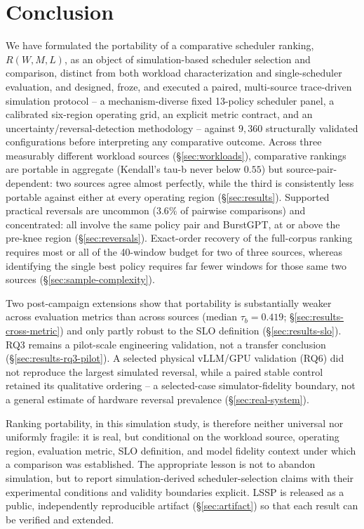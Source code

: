 \section{Conclusion}
\label{sec:conclusion}

We have formulated the portability of a comparative scheduler ranking,
$R(W, M, L)$, as an object of simulation-based scheduler selection and
comparison, distinct from both workload characterization and
single-scheduler evaluation, and designed, froze, and executed a paired,
multi-source trace-driven simulation protocol -- a mechanism-diverse fixed
13-policy scheduler panel, a calibrated six-region operating grid, an
explicit metric contract, and an uncertainty/reversal-detection methodology
-- against $9{,}360$ structurally validated configurations before
interpreting any comparative outcome. Across three measurably different
workload sources (\S\ref{sec:workloads}), comparative rankings are portable
in aggregate (Kendall's tau-b never below $0.55$) but source-pair-dependent:
two sources agree almost perfectly, while the third is consistently less
portable against either at every operating region (\S\ref{sec:results}).
Supported practical reversals are uncommon ($3.6\%$ of pairwise
comparisons) and concentrated: all involve the same policy pair and
BurstGPT, at or above the pre-knee region (\S\ref{sec:reversals}).
Exact-order recovery of the full-corpus ranking requires most or all of the
40-window budget for two of three sources, whereas identifying the single
best policy requires far fewer windows for those same two sources
(\S\ref{sec:sample-complexity}).

Two post-campaign extensions show that portability is substantially weaker
across evaluation metrics than across sources (median $\tau_b = 0.419$;
\S\ref{sec:results-cross-metric}) and only partly robust to the SLO
definition (\S\ref{sec:results-slo}). RQ3 remains a pilot-scale engineering
validation, not a transfer conclusion (\S\ref{sec:results-rq3-pilot}). A
selected physical vLLM/GPU validation (RQ6) did not reproduce the largest
simulated reversal, while a paired stable control retained its qualitative
ordering -- a selected-case simulator-fidelity boundary, not a general
estimate of hardware reversal prevalence (\S\ref{sec:real-system}).

Ranking portability, in this simulation study, is therefore neither
universal nor uniformly fragile: it is real, but conditional on the workload
source, operating region, evaluation metric, SLO definition, and model
fidelity context under which a comparison was established. The appropriate
lesson is not to abandon simulation, but to report simulation-derived
scheduler-selection claims with their experimental conditions and validity
boundaries explicit. LSSP is released as a public, independently
reproducible artifact (\S\ref{sec:artifact}) so that each result can be
verified and extended.
